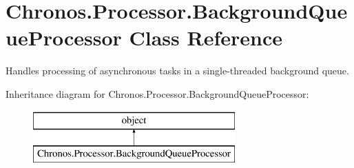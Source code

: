 \hypertarget{classChronos_1_1Processor_1_1BackgroundQueueProcessor}{}\section{Chronos.\+Processor.\+Background\+Queue\+Processor Class Reference}
\label{classChronos_1_1Processor_1_1BackgroundQueueProcessor}


Handles processing of asynchronous tasks in a single-\/threaded background queue.  


Inheritance diagram for Chronos.\+Processor.\+Background\+Queue\+Processor\+:\begin{figure}[H]
\begin{center}
\leavevmode
\includegraphics[height=2.000000cm]{classChronos_1_1Processor_1_1BackgroundQueueProcessor}
\end{center}
\end{figure}

